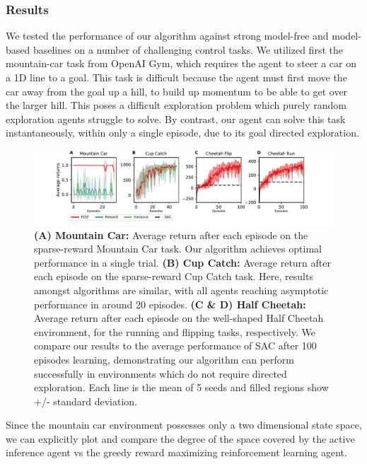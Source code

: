 \subsubsection{Results}

We tested the performance of our algorithm against strong model-free and model-based baselines on a number of challenging control tasks. We utilized first the mountain-car task from OpenAI Gym, which requires the agent to steer a car on a 1D line to a goal. This task is difficult because the agent must first move the car away from the goal up a hill, to build up momentum to be able to get over the larger hill. This poses a difficult exploration problem which purely random exploration agents struggle to solve. By contrast, our agent can solve this task instantaneously, within only a single episode, due to its goal directed exploration.

\begin{figure}[h]
   \label{fig:a}
   \centering 
      \includegraphics[width=15cm]{chapter_4_figures/RLAI_performance.pdf}
      \caption{\textbf{(A) Mountain Car:} Average return after each episode on the sparse-reward Mountain Car task. Our algorithm achieves optimal performance in a single trial. \textbf{(B) Cup Catch:} Average return after each episode on the sparse-reward Cup Catch task. Here, results amongst algorithms are similar, with all agents reaching asymptotic performance in around 20 episodes. \textbf{(C \& D) Half Cheetah:} Average return after each episode on the well-shaped Half Cheetah environment, for the running and flipping tasks, respectively. We compare our results to the average performance of SAC after 100 episodes learning, demonstrating our algorithm can perform successfully in environments which do not require directed exploration. Each line is the mean of 5 seeds and filled regions show +/- standard deviation.}
   \end{figure}

Since the mountain car environment possesses only a two dimensional state space, we can explicitly plot and compare the degree of the space covered by the active inference agent vs the greedy reward maximizing reinforcement learning agent.

